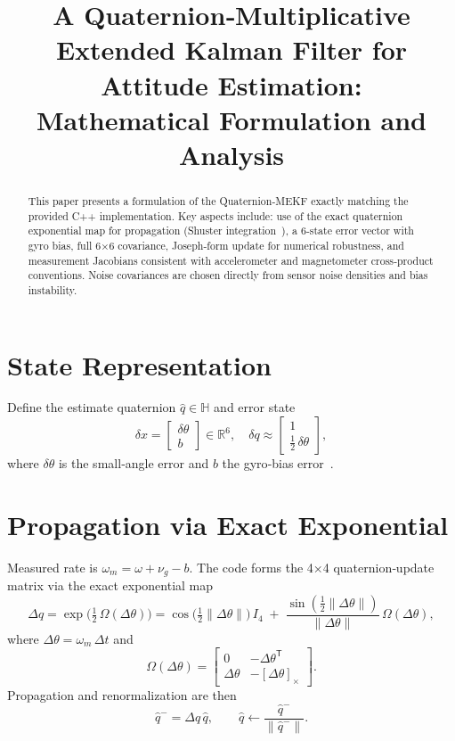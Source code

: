 \documentclass[11pt,letterpaper]{article}
\title{A Quaternion‐Multiplicative Extended Kalman Filter for Attitude Estimation:\\
Mathematical Formulation and Analysis}
\author{}
\date{}
\begin{document}
\maketitle

\begin{abstract}
This paper presents a formulation of the Quaternion‐MEKF exactly matching the provided C++ implementation.  Key aspects include: use of the exact quaternion exponential map for propagation (Shuster integration~\cite{Shuster1981}), a 6‐state error vector with gyro bias, full 6×6 covariance, Joseph‐form update for numerical robustness, and measurement Jacobians consistent with accelerometer and magnetometer cross‐product conventions.  Noise covariances are chosen directly from sensor noise densities and bias instability.
\end{abstract}

\section{State Representation}
Define the estimate quaternion $\hat q\in\mathbb H$ and error state
\[
\delta x = \begin{bmatrix}\delta\theta\\ b\end{bmatrix}\in\mathbb R^6,
\quad
\delta q \approx \begin{bmatrix}1\\ \tfrac12\,\delta\theta\end{bmatrix},
\]
where $\delta\theta$ is the small‐angle error and $b$ the gyro‐bias error~\cite{Lefferts1982,Markley2003}.

\section{Propagation via Exact Exponential}
Measured rate is $\omega_m=\omega+\nu_g - b$.  The code forms the 4×4 quaternion‐update matrix via the exact exponential map
\[
\Delta q
=\exp\!\bigl(\tfrac12\,\Omega(\Delta\theta)\bigr)
=\cos\!\bigl(\tfrac12\|\Delta\theta\|\bigr)\,I_4
\;+\;\frac{\sin(\tfrac12\|\Delta\theta\|)}{\|\Delta\theta\|}\,\Omega(\Delta\theta),
\]
where $\Delta\theta=\omega_m\,\Delta t$ and
\[
\Omega(\Delta\theta)
=\begin{bmatrix}
0 & -\Delta\theta^\mathsf{T}\\[3pt]
\Delta\theta & -[\Delta\theta]_\times
\end{bmatrix}.
\]
Propagation and renormalization are then
\[
\hat q^-=\Delta q\,\hat q,
\qquad
\hat q\leftarrow\frac{\hat q^-}{\|\hat q^-\|}.
\]
\end{document}
